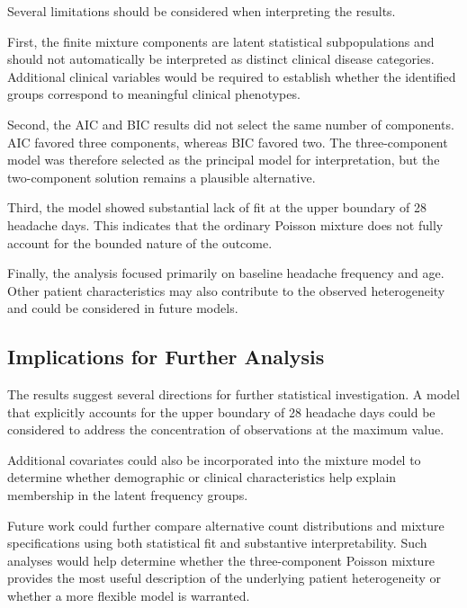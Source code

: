 Several limitations should be considered when interpreting the
results.

First, the finite mixture components are latent statistical
subpopulations and should not automatically be interpreted as
distinct clinical disease categories. Additional clinical variables
would be required to establish whether the identified groups
correspond to meaningful clinical phenotypes.

Second, the AIC and BIC results did not select the same number of
components. AIC favored three components, whereas BIC favored two.
The three-component model was therefore selected as the principal
model for interpretation, but the two-component solution remains a
plausible alternative.

Third, the model showed substantial lack of fit at the upper
boundary of 28 headache days. This indicates that the ordinary
Poisson mixture does not fully account for the bounded nature of the
outcome.

Finally, the analysis focused primarily on baseline headache
frequency and age. Other patient characteristics may also contribute
to the observed heterogeneity and could be considered in future
models.

\subsection{Implications for Further Analysis}

The results suggest several directions for further statistical
investigation. A model that explicitly accounts for the upper
boundary of 28 headache days could be considered to address the
concentration of observations at the maximum value.

Additional covariates could also be incorporated into the mixture
model to determine whether demographic or clinical characteristics
help explain membership in the latent frequency groups.

Future work could further compare alternative count distributions and
mixture specifications using both statistical fit and substantive
interpretability. Such analyses would help determine whether the
three-component Poisson mixture provides the most useful description
of the underlying patient heterogeneity or whether a more flexible
model is warranted.

